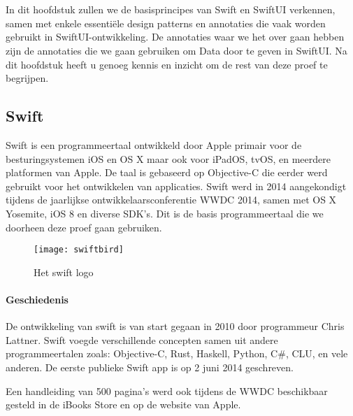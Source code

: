 \chapter{}%
\label{ch:stand-van-zaken}


In dit hoofdstuk zullen we de basisprincipes van Swift en SwiftUI verkennen, samen met enkele essentiële design patterns en annotaties die vaak worden gebruikt in SwiftUI-ontwikkeling. De annotaties waar we het over gaan hebben zijn de annotaties die we gaan gebruiken om Data door te geven in SwiftUI. Na dit hoofdstuk heeft u genoeg kennis en inzicht om de rest van deze proef te begrijpen.

\section{Swift}
\autocite{WikiSwift} Swift is een programmeertaal ontwikkeld door Apple primair voor de besturingsystemen iOS en OS X maar ook voor iPadOS, tvOS, en meerdere platformen van Apple. De taal is gebaseerd op Objective-C die eerder werd gebruikt voor het ontwikkelen van applicaties. Swift werd in 2014 aangekondigt tijdens de jaarlijkse ontwikkelaarsconferentie WWDC 2014, samen met OS X Yosemite, iOS 8 en diverse SDK's. Dit is de basis programmeertaal die we doorheen deze proef gaan gebruiken.
\begin{figure}[H]
    \centering
    \texttt{[image: swiftbird]} 
    \caption{Het swift logo \autocite{SwiftBirdImage}}
    \label{fig:swift}
\end{figure}
\subsubsection{Geschiedenis}
De ontwikkeling van swift is van start gegaan in 2010 door programmeur Chris Lattner. Swift voegde verschillende concepten samen uit andere programmeertalen zoals: Objective-C, Rust, Haskell, Python, C\#, CLU, en vele anderen. De eerste publieke Swift app is op 2 juni 2014 geschreven.

Een handleiding van 500 pagina's werd ook tijdens de WWDC beschikbaar gesteld in de iBooks Store en op de website van Apple.
